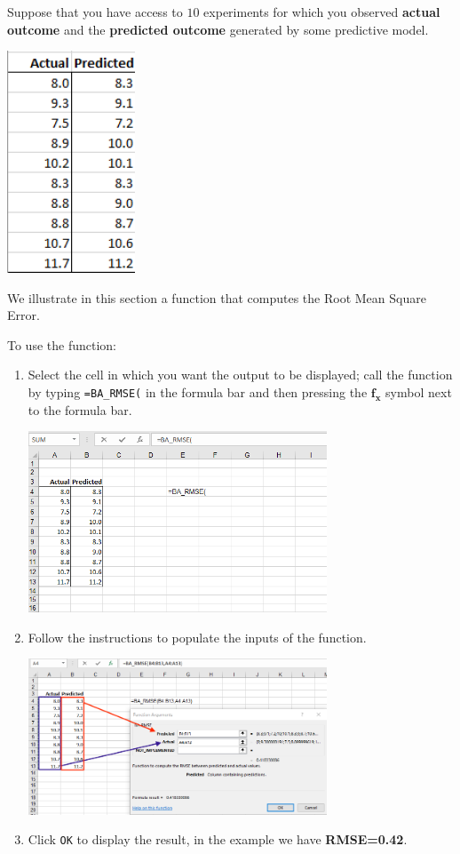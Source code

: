 \documentclass[12pt]{article}
\begin{document}
 Suppose that you have access to $10$ experiments for which you observed \textbf{actual outcome} and the \textbf{predicted outcome} generated by some predictive model. 
 
 \centerline{\includegraphics[width=1.5in]{figures/rmse1}}

 
We illustrate in this section a function that computes the Root Mean Square Error.

To use the function:
\begin{enumerate}
\item Select the cell in which you want the output to be displayed; call the function by typing \texttt{=BA\_RMSE(} in the formula bar and then pressing the $\boldsymbol{f_x}$ symbol next to the formula bar.
\medskip

\centerline{\includegraphics[width=3.5in]{figures/rmse2.png}}

\medskip

\item Follow the instructions to populate the inputs of the function.

\medskip
\centerline{\includegraphics[width=3.5in]{figures/rmse3.png}}


\medskip

\item Click \texttt{OK} to display the result, in the example we have \textbf{RMSE=0.42}.


\end{enumerate}
\end{document}
